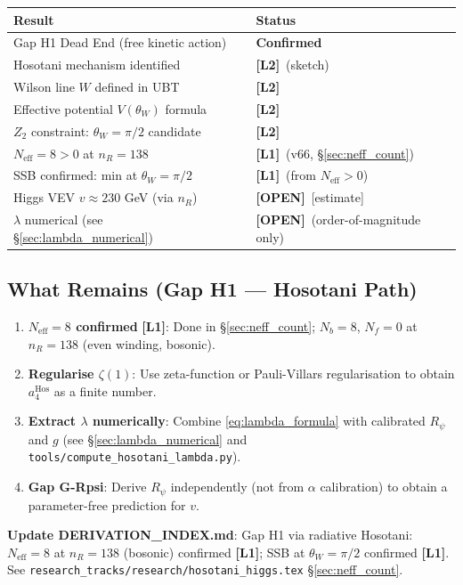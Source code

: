 \documentclass[12pt]{article}
\theoremstyle{definition}
\theoremstyle{remark}
\newcommand{\Lone}{\textbf{[L1]}}
\newcommand{\Ltwo}{\textbf{[L2]}}
\newcommand{\OPEN}{\textbf{[OPEN]}}
\begin{document}
\begin{center}
\begin{tabular}{|l|l|}
\hline
\textbf{Result} & \textbf{Status} \\
\hline
Gap H1 Dead End (free kinetic action) & \textbf{Confirmed} \\
Hosotani mechanism identified & \Ltwo\ (sketch) \\
Wilson line $W$ defined in UBT & \Ltwo \\
Effective potential $V(\theta_W)$ formula & \Ltwo \\
$Z_2$ constraint: $\theta_W = \pi/2$ candidate & \Ltwo \\
$N_{\text{eff}} = 8 > 0$ at $n_R = 138$ & \Lone\ (v66, §\ref{sec:neff_count}) \\
SSB confirmed: min at $\theta_W = \pi/2$ & \Lone\ (from $N_{\text{eff}} > 0$) \\
Higgs VEV $v \approx 230$ GeV (via $n_R$) & \OPEN\ [estimate] \\
$\lambda$ numerical (see §\ref{sec:lambda_numerical}) & \OPEN\ (order-of-magnitude only) \\
\hline
\end{tabular}
\end{center}

\subsection{What Remains (Gap H1 — Hosotani Path)}

\begin{enumerate}
  \item \textbf{$N_{\text{eff}} = 8$ confirmed} \Lone: Done in §\ref{sec:neff_count};
        $N_b = 8$, $N_f = 0$ at $n_R = 138$ (even winding, bosonic).
  \item \textbf{Regularise $\zeta(1)$}: Use zeta-function or Pauli-Villars
        regularisation to obtain $a_4^{\text{Hos}}$ as a finite number.
  \item \textbf{Extract $\lambda$ numerically}: Combine
        \eqref{eq:lambda_formula} with calibrated $R_\psi$ and $g$
        (see §\ref{sec:lambda_numerical} and \texttt{tools/compute\_hosotani\_lambda.py}).
  \item \textbf{Gap G-Rpsi}: Derive $R_\psi$ independently (not from
        $\alpha$ calibration) to obtain a parameter-free prediction for $v$.
\end{enumerate}

\textbf{Update DERIVATION\_INDEX.md}:
Gap H1 via radiative Hosotani: $N_{\text{eff}} = 8$ at $n_R = 138$ (bosonic)
confirmed \Lone; SSB at $\theta_W = \pi/2$ confirmed \Lone.
See \texttt{research\_tracks/research/hosotani\_higgs.tex} §\ref{sec:neff_count}.
\end{document}
